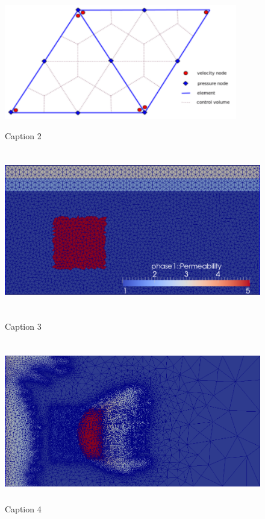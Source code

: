 \documentclass[preprint,authoryear,12pt]{elsarticle}
\begin{document}
\begin{figure}[h]
 
\begin{center}
\centering
\includegraphics[width=0.75\linewidth, height=5cm]{./Pics/P1DG-P2_element_type} 
\caption{Caption 2}
\label{fig:2}
\end{center}

\begin{center}
\centering
\includegraphics[width=0.8\linewidth, height=7cm]{./Pics/4r_po_adapt_fine_125_mesh} 
\caption{Caption 3}
\label{fig:3}
\end{center}

\begin{center}
\centering
\includegraphics[width=0.8\linewidth, height=7cm]{./Pics/4r_po_adapt_fine_100_mesh}
\caption{Caption 4}
\label{fig:4}
\end{center}
 
\label{fig:image2}
\end{figure}
\pagebreak
\clearpage
\end{document}
